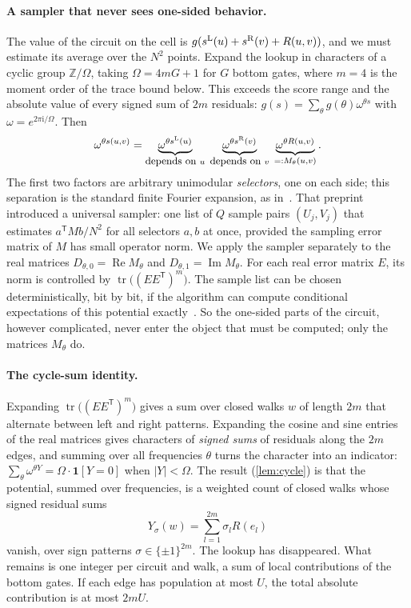 \documentclass[11pt,letterpaper]{article}
\theoremstyle{definition}
\theoremstyle{remark}
\newcommand{\Z}{\mathbb Z}
\newcommand{\tr}{\operatorname{tr}}
\newcommand{\ind}{\mathbf 1}
\newcommand{\iu}{\mathrm i}
\begin{document}
\paragraph{A sampler that never sees one-sided behavior.}
The value of the circuit on the cell is
\(g(s^{\rm L}(u)+s^{\rm R}(v)+R(u,v))\), and we must estimate its
average over the \(N^2\) points. Expand the lookup in characters of a
cyclic group \(\Z/\Omega\), taking \(\Omega=4mG+1\) for \(G\)
bottom gates, where \(m=4\) is the moment order of the trace bound below. This exceeds the score range
and the absolute value of every signed sum of \(2m\) residuals:
\(g(s)=\sum_\theta\widehat g(\theta)\omega^{\theta s}\) with
\(\omega=e^{2\pi\iu/\Omega}\). Then
\[
 \omega^{\theta s(u,v)}
 =\underbrace{\omega^{\theta s^{\rm L}(u)}}_{\text{\fontsize{9}{10.8}\selectfont depends on }u}\;
  \underbrace{\omega^{\theta s^{\rm R}(v)}}_{\text{\fontsize{9}{10.8}\selectfont depends on }v}\;
  \underbrace{\omega^{\theta R(u,v)}}_{=:M_\theta(u,v)} .
\]
The first two factors are arbitrary unimodular \emph{selectors}, one
on each side; this separation is the standard finite Fourier
expansion, as in~\cite[Equation~(29)]{Nag72}.
That preprint introduced a universal sampler:
one list of \(Q\) sample pairs \((U_j,V_j)\) that estimates
\(a^{\mathsf T}Mb/N^2\) for all selectors \(a,b\) at once, provided the
sampling error matrix of \(M\) has small operator norm. We apply the
sampler separately to the real matrices
\(D_{\theta,0}=\operatorname{Re}M_\theta\) and
\(D_{\theta,1}=\operatorname{Im}M_\theta\).
For each real error matrix \(E\), its norm is controlled by
\(\tr\bigl((EE^{\mathsf T})^m\bigr)\). The sample list can be chosen
deterministically, bit by bit, if the algorithm can compute
conditional expectations of this potential exactly~\cite[Appendix~F]{Nag72}.
So the one-sided parts of the circuit, however complicated, never
enter the object that must be computed; only the matrices
\(M_\theta\) do.

\paragraph{The cycle-sum identity.}
Expanding \(\tr\bigl((EE^{\mathsf T})^m\bigr)\) gives a sum over closed walks
\(w\) of length \(2m\) that alternate between left and right
patterns. Expanding the cosine and sine entries of the real
matrices gives characters of \emph{signed sums} of residuals along
the \(2m\) edges, and summing over all frequencies \(\theta\) turns
the character into an indicator:
\(\sum_\theta\omega^{\theta Y}=\Omega\cdot\ind[Y=0]\) when
\(|Y|<\Omega\). The result (\cref{lem:cycle}) is that the potential,
summed over frequencies, is a weighted count of closed walks whose
signed residual sums
\[
 Y_\sigma(w)=\sum_{l=1}^{2m}\sigma_lR(e_l)
\]
vanish, over sign patterns \(\sigma\in\{\pm1\}^{2m}\). The lookup has
disappeared. What remains is one integer per circuit and walk, a sum of
local contributions of the bottom gates. If each edge has population
at most \(U\), the total absolute contribution is at most \(2mU\).
\end{document}

